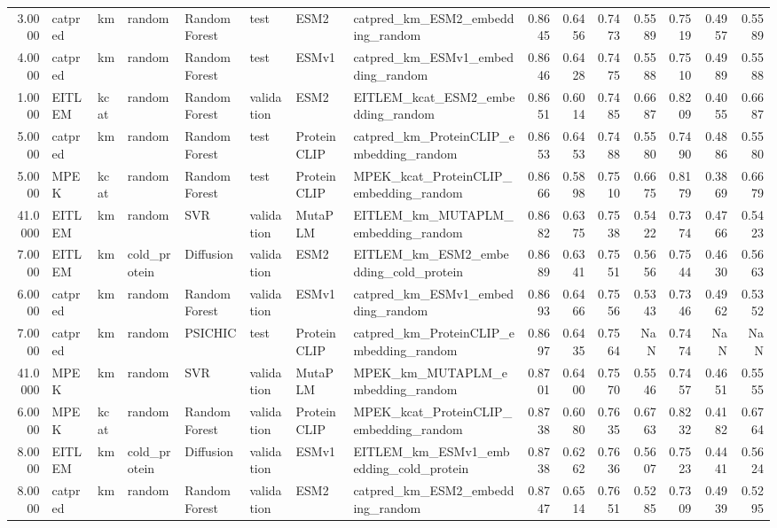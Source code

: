 \begin{tabular}{rlllllllrrrrrrr}
3.0000 & catpred & km & random & Random Forest & test & ESM2 & catpred_km_ESM2_embedding_random & 0.8645 & 0.6456 & 0.7473 & 0.5589 & 0.7519 & 0.4957 & 0.5589 \\
4.0000 & catpred & km & random & Random Forest & test & ESMv1 & catpred_km_ESMv1_embedding_random & 0.8646 & 0.6428 & 0.7475 & 0.5588 & 0.7510 & 0.4989 & 0.5588 \\
1.0000 & EITLEM & kcat & random & Random Forest & validation & ESM2 & EITLEM_kcat_ESM2_embedding_random & 0.8651 & 0.6014 & 0.7485 & 0.6687 & 0.8209 & 0.4055 & 0.6687 \\
5.0000 & catpred & km & random & Random Forest & test & ProteinCLIP & catpred_km_ProteinCLIP_embedding_random & 0.8653 & 0.6453 & 0.7488 & 0.5580 & 0.7490 & 0.4886 & 0.5580 \\
5.0000 & MPEK & kcat & random & Random Forest & test & ProteinCLIP & MPEK_kcat_ProteinCLIP_embedding_random & 0.8666 & 0.5898 & 0.7510 & 0.6675 & 0.8179 & 0.3869 & 0.6679 \\
41.0000 & EITLEM & km & random & SVR & validation & MutaPLM & EITLEM_km_MUTAPLM_embedding_random & 0.8682 & 0.6375 & 0.7538 & 0.5422 & 0.7374 & 0.4766 & 0.5423 \\
7.0000 & EITLEM & km & cold_protein & Diffusion & validation & ESM2 & EITLEM_km_ESM2_embedding_cold_protein & 0.8689 & 0.6341 & 0.7551 & 0.5656 & 0.7544 & 0.4630 & 0.5663 \\
6.0000 & catpred & km & random & Random Forest & validation & ESMv1 & catpred_km_ESMv1_embedding_random & 0.8693 & 0.6466 & 0.7556 & 0.5343 & 0.7346 & 0.4962 & 0.5352 \\
7.0000 & catpred & km & random & PSICHIC & test & ProteinCLIP & catpred_km_ProteinCLIP_embedding_random & 0.8697 & 0.6435 & 0.7564 & NaN & 0.7474 & NaN & NaN \\
41.0000 & MPEK & km & random & SVR & validation & MutaPLM & MPEK_km_MUTAPLM_embedding_random & 0.8701 & 0.6400 & 0.7570 & 0.5546 & 0.7457 & 0.4651 & 0.5555 \\
6.0000 & MPEK & kcat & random & Random Forest & validation & ProteinCLIP & MPEK_kcat_ProteinCLIP_embedding_random & 0.8738 & 0.6080 & 0.7635 & 0.6763 & 0.8232 & 0.4182 & 0.6764 \\
8.0000 & EITLEM & km & cold_protein & Diffusion & validation & ESMv1 & EITLEM_km_ESMv1_embedding_cold_protein & 0.8738 & 0.6262 & 0.7636 & 0.5607 & 0.7523 & 0.4441 & 0.5624 \\
8.0000 & catpred & km & random & Random Forest & validation & ESM2 & catpred_km_ESM2_embedding_random & 0.8747 & 0.6514 & 0.7651 & 0.5285 & 0.7309 & 0.4939 & 0.5295 \\

\end{tabular}
